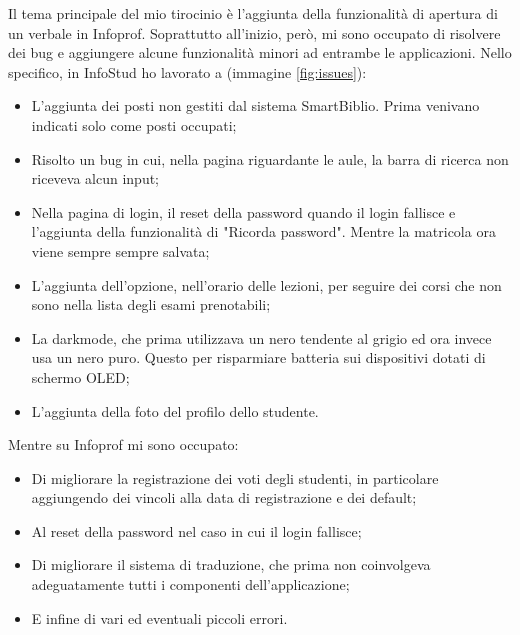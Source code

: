 \documentclass[Lau, oneside, noexaminfo]{sapthesis}%
\begin{document}

Il tema principale del mio tirocinio è l'aggiunta della funzionalità di apertura di un verbale in Infoprof. Soprattutto all'inizio, però, mi sono occupato di risolvere dei bug e aggiungere alcune funzionalità minori ad entrambe le applicazioni. Nello specifico, in InfoStud ho lavorato a (immagine \ref{fig:issues}):
\begin{itemize}
	\item L'aggiunta dei posti non gestiti dal sistema SmartBiblio. Prima venivano indicati solo come posti occupati;
	\item Risolto un bug in cui, nella pagina riguardante le aule, la barra di ricerca non riceveva alcun input;
	\item Nella pagina di login, il reset della password quando il login fallisce e l'aggiunta della funzionalità di "Ricorda password". Mentre la matricola ora viene sempre sempre salvata;
	\item L'aggiunta dell'opzione, nell'orario delle lezioni, per seguire dei corsi che non sono nella lista degli esami prenotabili;
	\item La darkmode, che prima utilizzava un nero tendente al grigio ed ora invece usa un nero puro. Questo per risparmiare batteria sui dispositivi dotati di schermo OLED;
	\item L'aggiunta della foto del profilo dello studente.
\end{itemize}

Mentre su Infoprof mi sono occupato:
\begin{itemize}
	\item Di migliorare la registrazione dei voti degli studenti, in particolare aggiungendo dei vincoli alla data di registrazione e dei default;
	\item Al reset della password nel caso in cui il login fallisce;
	\item Di migliorare il sistema di traduzione, che prima non coinvolgeva adeguatamente tutti i componenti dell'applicazione;
	\item E infine di vari ed eventuali piccoli errori.
\end{itemize}
\end{document}
